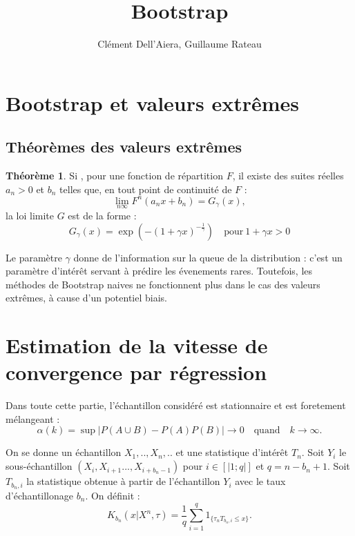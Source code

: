 \documentclass{article}
\title{Bootstrap}
\author{ Cl\'ement Dell'Aiera, Guillaume Rateau}
\date{}
\theoremstyle{definition}
\newtheorem{thm}{Théorème}
\begin{document}
\maketitle

\begin{abstract}

\end{abstract}


\newpage
\tableofcontents

\newpage

\setlength{\parindent}{0cm}
\section{Bootstrap et valeurs extrêmes}

\subsection{Théorèmes des valeurs extrêmes}


\begin{thm}
Si , pour une fonction de répartition $F$, il existe des suites réelles $a_n>0$ et $b_n$ telles que, en tout point de continuité de $F$ :
\[\lim_{n\infty} F^n(a_n x + b_n)=G_\gamma(x),\]
\noindent la loi limite $G$ est de la forme :
\[G_\gamma (x) = \exp(-(1+\gamma x )^{-\frac{1}{\gamma}}) \quad \text{pour} \ 1+\gamma x >0\]
\end{thm}

Le paramètre $\gamma$ donne de l'information sur la queue de la distribution : c'est un paramètre d'intérêt servant à prédire les évenements rares. Toutefois, les méthodes de Bootstrap naives ne fonctionnent plus dans le cas des valeurs extrêmes, à cause d'un potentiel biais.\\

\section{Estimation de la vitesse de convergence par régression}

Dans toute cette partie, l'échantillon considéré est stationnaire et est foretement mélangeant : \[\alpha(k)=\sup |P(A\cup B)-P(A)P(B)|\rightarrow 0 \quad \text{quand}\quad k\rightarrow\infty.\] 

On se donne un échantillon $X_1,..,X_n,..$ et une statistique d'intérêt $T_n$. Soit $Y_i$ le sous-échantillon $(X_i,X_{i+1}...,X_{i+b_n-1})$ pour $i\in[|1;q|]$ et $q=n-b_n+1$. Soit $T_{b_n,i}$ la statistique obtenue à partir de l'échantillon $Y_i$ avec le taux d'échantillonage $b_n$. On définit :
\[K_{b_n}(x|X^n,\tau)=\frac{1}{q}\sum_{i=1}^q  1_{\{\tau_n T_{b_n,i}\leq x\}}.\]
\end{document}

